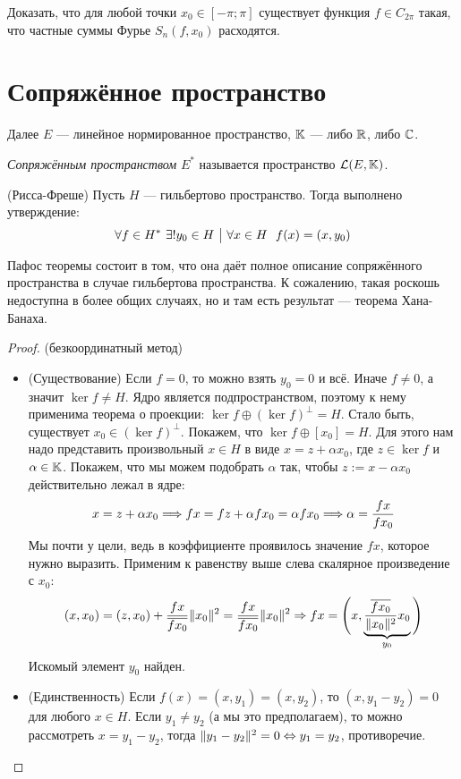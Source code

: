 \begin{exercise}
	Доказать, что для любой точки $x_0 \in [-\pi; \pi]$ существует функция $f \in C_{2\pi}$ такая, что частные суммы Фурье $S_n(f, x_0)$ расходятся.
\end{exercise}

\section{Сопряжённое пространство}

\begin{note}
	Далее $E$ --- линейное нормированное пространство, $\mathbb{K}$ --- либо $\mathbb{R}$, либо $\mathbb{C}$.
\end{note}

\begin{definition}
	\textit{Сопряжённым пространством} $E^*$ называется пространство $\mathcal{L}(E, \mathbb{K})$.
\end{definition}

\begin{theorem} (Рисса-Фреше)
	Пусть $H$ --- гильбертово пространство. Тогда выполнено утверждение:
	\[
		\forall f \in H^*\ \exists! y_0 \in H \ \big|\  \forall x \in H\ \ f(x) = (x, y_0)
	\]
\end{theorem}

\begin{note}
	Пафос теоремы состоит в том, что она даёт полное описание сопряжённого пространства в случае гильбертова пространства. К сожалению, такая роскошь недоступна в более общих случаях, но и там есть результат --- теорема Хана-Банаха.
\end{note}

\begin{proof} (безкоординатный метод)
	\begin{itemize}
		\item (Существование) Если $f = 0$, то можно взять $y_0 = 0$ и всё. Иначе $f \neq 0$, а значит $\ker f \neq H$. Ядро является подпространством, поэтому к нему применима теорема о проекции: $\ker f \oplus (\ker f)^\bot = H$. Стало быть, существует $x_0 \in (\ker f)^\bot$. Покажем, что $\ker f \oplus [x_0] = H$. Для этого нам надо представить произвольный $x \in H$ в виде $x = z + \alpha x_0$, где $z \in \ker f$ и $\alpha \in \mathbb{K}$. Покажем, что мы можем подобрать $\alpha$ так, чтобы $z := x - \alpha x_0$ действительно лежал в ядре:
		\[
			x = z + \alpha x_0 \Longrightarrow fx = fz + \alpha fx_0 = \alpha fx_0 \Longrightarrow \alpha = \frac{fx}{fx_0}
		\]
		Мы почти у цели, ведь в коэффициенте проявилось значение $fx$, которое нужно выразить. Применим к равенству выше слева скалярное произведение с $x_0$:
		\[
			(x, x_0) = (z, x_0) + \frac{fx}{\overline{fx_0}} \|x_0\|^2 = \frac{fx}{\overline{fx_0}} \|x_0\|^2 \Rightarrow fx = \Bigg(x, \underbrace{\frac{\overline{fx_0}}{\|x_0\|^2} x_0}_{y_0}\Bigg)
		\]
		Искомый элемент $y_0$ найден.
		
		\item (Единственность) Если $f(x) = (x, y_1) = (x, y_2)$, то $(x, y_1 - y_2) = 0$ для любого $x \in H$. Если $y_1 \neq y_2$ (а мы это предполагаем), то можно рассмотреть $x = y_1 - y_2$, тогда $\|y_1 - y_2\|^2 = 0 \Leftrightarrow y_1 = y_2$, противоречие.
	\end{itemize}
\end{proof}

